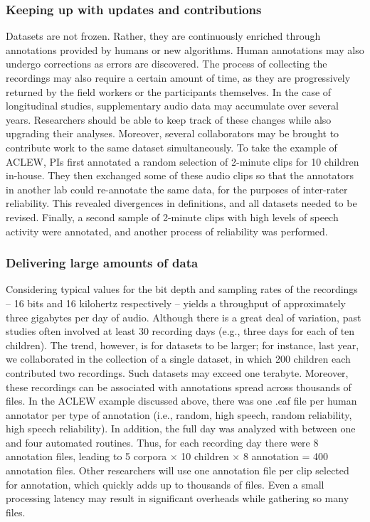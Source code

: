 \documentclass[smallextended]{svjour3}       %
\begin{document}
\subsubsection*{Keeping up with updates and contributions}

Datasets are not frozen. Rather, they are continuously enriched through annotations provided by humans or new algorithms. Human annotations may also undergo corrections as errors are discovered. The process of collecting the recordings may also require a certain amount of time, as they are progressively returned by the field workers or the participants themselves. In the case of longitudinal studies, supplementary audio data may accumulate over several years. Researchers should be able to keep track of these changes while also upgrading their analyses. Moreover, several collaborators may be brought to contribute work to the same dataset simultaneously. To take the example of ACLEW, PIs first annotated a random selection of 2-minute clips for 10 children in-house. They then exchanged some of these audio clips so that the annotators in another lab could re-annotate the same data, for the purposes of inter-rater reliability. This revealed divergences in definitions, and all datasets needed to be revised. Finally, a second sample of 2-minute clips with high levels of speech activity were annotated, and another process of reliability was performed.

\subsubsection*{Delivering large amounts of data}

Considering typical values for the bit depth and sampling rates of the recordings -- 16 bits and 16 kilohertz respectively -- yields a throughput of approximately three gigabytes per day of audio. Although there is a great deal of variation, past studies often involved at least 30 recording days (e.g., three days for each of ten children). The trend, however, is for datasets to be larger; for instance, last year, we collaborated in the collection of a single dataset, in which 200 children each contributed two recordings. Such datasets may exceed one terabyte. Moreover, these recordings can be associated with annotations spread across thousands of files. In the ACLEW example discussed above, there was one .eaf file per human annotator per type of annotation (i.e., random, high speech, random reliability, high speech reliability). In addition, the full day was analyzed with between one and four automated routines. Thus, for each recording day there were 8 annotation files, leading to 5 corpora $\times$ 10 children $\times$ 8 annotation = 400 annotation files. Other researchers will use one annotation file per clip selected for annotation, which quickly adds up to thousands of files. Even a small processing latency may result in significant overheads while gathering so many files. 
\end{document}
